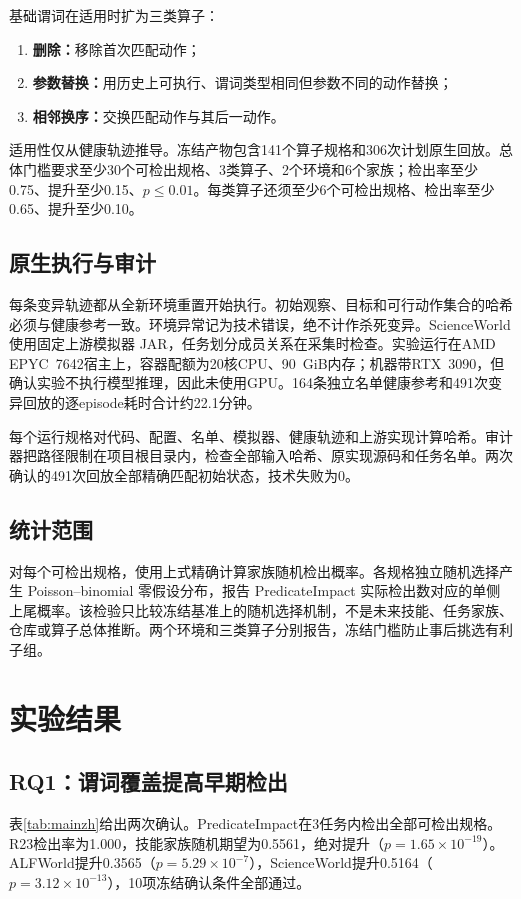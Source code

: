 \documentclass[10pt]{article}
\begin{document}
基础谓词在适用时扩为三类算子：
\begin{enumerate}
  \item \textbf{删除：}移除首次匹配动作；
  \item \textbf{参数替换：}用历史上可执行、谓词类型相同但参数不同的动作替换；
  \item \textbf{相邻换序：}交换匹配动作与其后一动作。
\end{enumerate}
适用性仅从健康轨迹推导。冻结产物包含141个算子规格和306次计划原生回放。总体门槛要求至少30个可检出规格、3类算子、2个环境和6个家族；检出率至少0.75、提升至少0.15、$p\leq0.01$。每类算子还须至少6个可检出规格、检出率至少0.65、提升至少0.10。

\subsection{原生执行与审计}
每条变异轨迹都从全新环境重置开始执行。初始观察、目标和可行动作集合的哈希必须与健康参考一致。环境异常记为技术错误，绝不计作杀死变异。ScienceWorld 使用固定上游模拟器 JAR，任务划分成员关系在采集时检查。实验运行在AMD EPYC~7642宿主上，容器配额为20核CPU、90~GiB内存；机器带RTX~3090，但确认实验不执行模型推理，因此未使用GPU。164条独立名单健康参考和491次变异回放的逐episode耗时合计约22.1分钟。

每个运行规格对代码、配置、名单、模拟器、健康轨迹和上游实现计算哈希。审计器把路径限制在项目根目录内，检查全部输入哈希、原实现源码和任务名单。两次确认的491次回放全部精确匹配初始状态，技术失败为0。

\subsection{统计范围}
对每个可检出规格，使用上式精确计算家族随机检出概率。各规格独立随机选择产生 Poisson--binomial 零假设分布，报告 PredicateImpact 实际检出数对应的单侧上尾概率。该检验只比较冻结基准上的随机选择机制，不是未来技能、任务家族、仓库或算子总体推断。两个环境和三类算子分别报告，冻结门槛防止事后挑选有利子组。

\section{实验结果}
\subsection{RQ1：谓词覆盖提高早期检出}
表\ref{tab:mainzh}给出两次确认。PredicateImpact在3任务内检出全部可检出规格。R23检出率为1.000，技能家族随机期望为0.5561，绝对提升\RXXIIILift{}（$p=1.65\times10^{-19}$）。ALFWorld提升0.3565（$p=5.29\times10^{-7}$），ScienceWorld提升0.5164（$p=3.12\times10^{-13}$），10项冻结确认条件全部通过。
\end{document}
